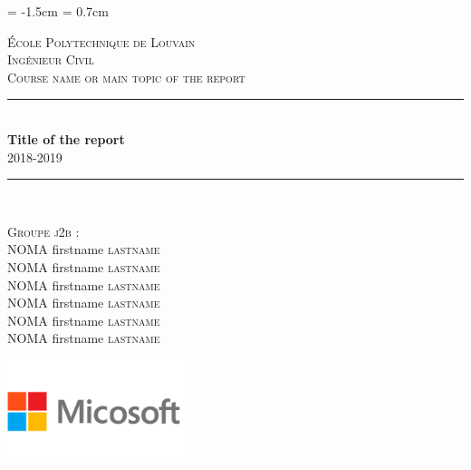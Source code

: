 \documentclass{article}
\begin{document}
\begin{titlepage}
  \begin{sffamily}
  \begin{center}

\newcommand\tab[1][1cm]{\hspace*{#1}}
\newcommand{\HRule}{\rule{\linewidth}{0.5mm}}
\topmargin = -1.5cm
\headsep = 0.7cm

    \textsc{\LARGE École Polytechnique de Louvain}\\[1cm]
    
    \textsc{\Large Ingénieur Civil}\\[1cm]
    
    \textsc{\Large Course name or main topic of the report}\\[1cm]

    \HRule \\[0.4cm]
    { \huge \bfseries Title of the report\\[0.4cm] }
    \Large{2018-2019}
    \HRule \\[2cm]
    
    \begin{multicols}{2}
    \begin{flushleft}
    \vspace{1cm}
    \textsc{Groupe j2b :}\vspace{0.5cm}\\
    \large
        NOMA firstname \textsc{lastname} \\ \vspace{0.2cm}
        NOMA firstname \textsc{lastname} \\ \vspace{0.2cm}
        NOMA firstname \textsc{lastname} \\ \vspace{0.2cm}
        NOMA firstname \textsc{lastname} \\ \vspace{0.2cm}
        NOMA firstname \textsc{lastname} \\ \vspace{0.2cm}
        NOMA firstname \textsc{lastname} \\ \vspace{0.2cm}
        
    \end{flushleft}
        
        \columnbreak
        \includegraphics[width =0.4\textwidth]{logo_micosoft.png}
        \vskip 1cm
        \end{multicols}


\end{center}
\end{sffamily}
\end{titlepage}
\end{document}
